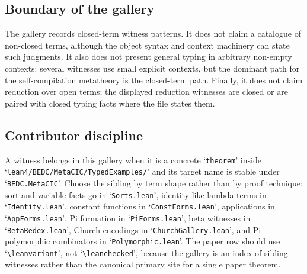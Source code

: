 \subsection{Boundary of the gallery}\label{subsec:typed-examples-gallery-boundary}

The gallery records closed-term witness patterns.  It does not claim a catalogue
of non-closed terms, although the object syntax and context machinery can state
such judgments.  It also does not present general typing in arbitrary non-empty
contexts: several witnesses use small explicit contexts, but the dominant path
for the self-compilation metatheory is the closed-term path.  Finally, it does
not claim reduction over open terms; the displayed reduction witnesses are
closed or are paired with closed typing facts where the file states them.

\subsection{Contributor discipline}\label{subsec:typed-examples-gallery-contributor}

A witness belongs in this gallery when it is a concrete `\verb|theorem|' inside
`\verb|lean4/BEDC/MetaCIC/TypedExamples/|' and its target name is stable under
`\verb|BEDC.MetaCIC|'.  Choose the sibling by term shape rather than by proof
technique: sort and variable facts go in `\verb|Sorts.lean|', identity-like
lambda terms in `\verb|Identity.lean|', constant functions in
`\verb|ConstForms.lean|', applications in `\verb|AppForms.lean|', Pi formation
in `\verb|PiForms.lean|', beta witnesses in `\verb|BetaRedex.lean|', Church
encodings in `\verb|ChurchGallery.lean|', and Pi-polymorphic combinators in
`\verb|Polymorphic.lean|'.  The paper row should use `\verb|\leanvariant|',
not `\verb|\leanchecked|', because the gallery is an index of sibling witnesses
rather than the canonical primary site for a single paper theorem.
